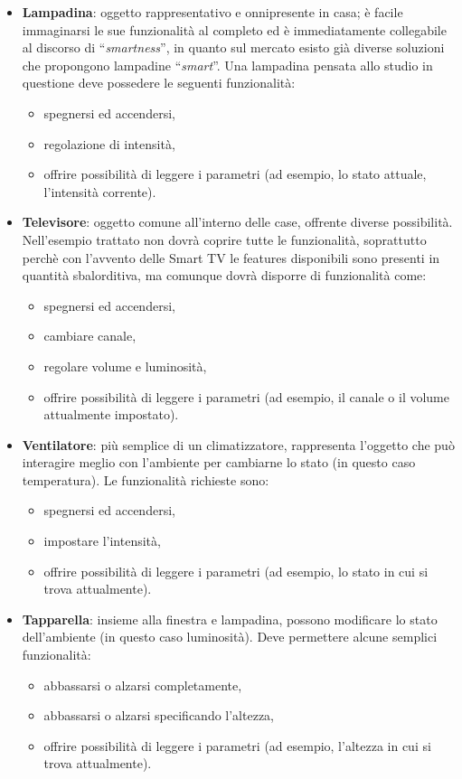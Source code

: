 \documentclass[12pt,a4paper,openright,oneside]{report}
\newcommand{\quotes}[1]{``#1''}
\begin{document}
\begin{itemize}
	\item \textbf{Lampadina}: oggetto rappresentativo e onnipresente in casa; è facile immaginarsi le sue funzionalità al completo ed è immediatamente collegabile al discorso di \quotes{\textit{smartness}}, in quanto sul mercato esisto già diverse soluzioni che propongono lampadine \quotes{\textit{smart}}. Una lampadina pensata allo studio in questione deve possedere le seguenti funzionalità:
	\begin{itemize}
		\setlength\itemsep{-0.0em}
		\item spegnersi ed accendersi,
		\item regolazione di intensità,
		\item offrire possibilità di leggere i parametri (ad esempio, lo stato attuale, l'intensità corrente).
	\end{itemize}
	
	\item \textbf{Televisore}: oggetto comune all'interno delle case, offrente diverse possibilità. Nell'esempio trattato non dovrà coprire tutte le funzionalità, soprattutto perchè con l'avvento delle Smart TV le features disponibili sono presenti in quantità sbalorditiva, ma comunque dovrà disporre di funzionalità come:
	\begin{itemize}
		\setlength\itemsep{-0.0em}
		\item spegnersi ed accendersi,
		\item cambiare canale,
		\item regolare volume e luminosità,
		\item offrire possibilità di leggere i parametri (ad esempio, il canale o il volume attualmente impostato).
	\end{itemize}
	
	\item \textbf{Ventilatore}: più semplice di un climatizzatore, rappresenta l'oggetto che può interagire meglio con l'ambiente per cambiarne lo stato (in questo caso temperatura). Le funzionalità richieste sono:
	\begin{itemize}
		\setlength\itemsep{-0.0em}
		\item spegnersi ed accendersi,
		\item impostare l'intensità,
		\item offrire possibilità di leggere i parametri (ad esempio, lo stato in cui si trova attualmente).
	\end{itemize}
	
	\item \textbf{Tapparella}: insieme alla finestra e lampadina, possono modificare lo stato dell'ambiente (in questo caso luminosità). Deve permettere alcune semplici funzionalità:
	\begin{itemize}
		\setlength\itemsep{-0.0em}
		\item abbassarsi o alzarsi completamente,
		\item abbassarsi o alzarsi specificando l'altezza,
		\item offrire possibilità di leggere i parametri (ad esempio, l'altezza in cui si trova attualmente).
	\end{itemize}
\end{itemize}
\end{document}

